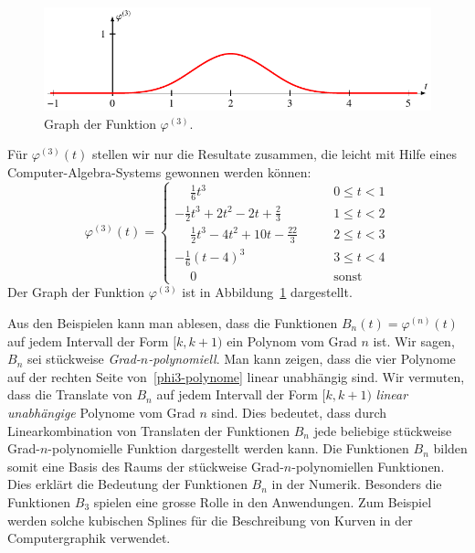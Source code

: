 \begin{beispiel}
\begin{figure}
\centering
\includegraphics{chapters/9-spline/images/phi3.pdf}
\caption{Graph der Funktion $\varphi^{(3)}$.
\label{spline:phi3}}
\end{figure}
Für $\varphi^{(3)}(t)$ stellen wir nur die Resultate
zusammen, die leicht mit Hilfe eines Computer-Algebra-Systems
gewonnen werden können:
\begin{equation}
\varphi^{(3)}(t)
=
\begin{cases}
\displaystyle
\phantom{-}
\frac16t^3
&\qquad
0\le t<1
\\[9pt]
\displaystyle
-\frac12t^3+2t^2-2t+\frac23
&\qquad
1\le t<2
\\[9pt]
\displaystyle
\phantom{-}
\frac12t^3-4t^2+10t-\frac{22}3
&\qquad
2\le t<3
\\[9pt]
\displaystyle
-\frac16(t-4)^3
&\qquad
3\le t<4
\\[9pt]
\displaystyle
\phantom{-}
0&\qquad\text{sonst}
\end{cases}
\label{phi3-polynome}
\end{equation}
Der Graph der Funktion $\varphi^{(3)}$ ist in Abbildung~\ref{spline:phi3}
dargestellt.
\end{beispiel}

Aus den Beispielen kann man ablesen, dass die Funktionen
$B_n(t)=\varphi^{(n)}(t)$ auf jedem Intervall der Form $[k,k+1)$ 
ein Polynom vom Grad $n$ ist.
Wir sagen, $B_n$ sei stückweise {\em Grad-$n$-polynomiell}.
Man kann zeigen, dass die vier Polynome auf der rechten
Seite von~\eqref{phi3-polynome} linear unabhängig sind.
Wir vermuten, dass die Translate von $B_n$ auf jedem Intervall der Form
$[k,k+1)$ {\em linear unabhängige} Polynome vom Grad $n$ sind.
Dies bedeutet, dass durch Linearkombination von Translaten der
Funktionen $B_n$ jede beliebige stückweise Grad-$n$-polynomielle
Funktion dargestellt werden kann.
Die Funktionen $B_n$ bilden somit eine Basis des Raums der stückweise 
Grad-$n$-polynomiellen Funktionen.
Dies erklärt die Bedeutung der Funktionen $B_n$ in der Numerik.
Besonders die Funktionen $B_3$ spielen eine grosse Rolle in den
Anwendungen.
Zum Beispiel werden solche kubischen Splines für die Beschreibung
von Kurven in der Computergraphik verwendet.

